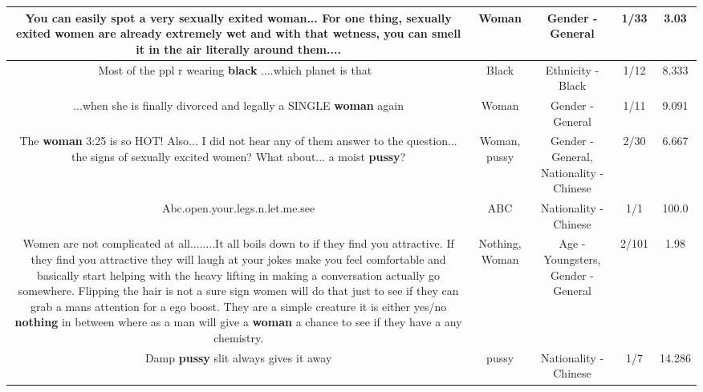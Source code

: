 \documentclass[11pt]{article}
\newlength\mylength
\begin{document}
\begin{center}
\begin{longtable}{|C{.65\mylength}|C{.30\mylength}|C{.12\mylength}|C{.12\mylength}|C{.12\mylength}|}
  \small You can easily spot a very sexually exited \textbf{woman}...  For one thing, sexually exited women are already extremely wet and with that wetness, you can smell it in the air literally around them....\normalsize   & Woman & Gender - General & 1/33 & 3.03 \\  \hline
  \small Most of the ppl r wearing \textbf{black} ....which  planet is that 🤔\normalsize   & Black & Ethnicity - Black & 1/12 & 8.333 \\  \hline
  \small ...when she is finally divorced and legally a SINGLE \textbf{woman} again\normalsize   & Woman & Gender - General & 1/11 & 9.091 \\  \hline
  \small The \textbf{woman} \@ 3:25 is so HOT! Also... I did not hear any of them answer to the question... the signs of sexually excited women? What about... a moist \textbf{pussy}?\normalsize   & Woman, pussy & Gender - General, Nationality - Chinese & 2/30 & 6.667 \\  \hline
  \small Abc.open.your.legs.n.let.me.see\normalsize   & ABC & Nationality - Chinese & 1/1 & 100.0 \\  \hline
  \small Women are not complicated at all........It all boils down to if they find you attractive.  If they find you attractive  they will laugh at your jokes make you feel comfortable and basically start helping with the heavy lifting in making a conversation actually go somewhere.  Flipping the hair is not a sure sign women will do that just to see if they can grab a mans attention for a ego boost.  They are a simple creature  it is either yes/no  \textbf{nothing} in between  where as a man will give a \textbf{woman} a chance to see if they have a any chemistry.\normalsize   & Nothing, Woman & Age - Youngsters, Gender - General & 2/101 & 1.98 \\  \hline
  \small Damp \textbf{pussy} slit always gives it away\normalsize   & pussy & Nationality - Chinese & 1/7 & 14.286 \\  \hline

\end{longtable}
\end{center}
\end{document}

